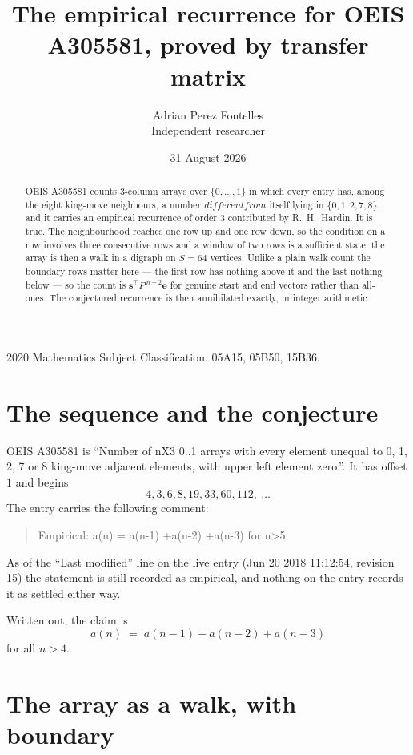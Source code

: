 \documentclass[11pt,a4paper]{article}
\title{The empirical recurrence for OEIS A305581, proved by transfer matrix}
\author{Adrian Perez Fontelles\\ \small Independent researcher}
\date{31 August 2026}
\theoremstyle{plain}
\theoremstyle{definition}
\begin{document}
\maketitle

\begin{abstract}
OEIS A305581 counts $3$-column arrays over $\{0,\dots,1\}$ in which every entry has,
among the eight king-move neighbours, a number $different from$ itself lying in $\{0,1,2,7,8\}$, and it carries an empirical
recurrence of order $3$ contributed by R.~H.~Hardin. It is true. The neighbourhood
reaches one row up and one row down, so the condition on a row involves three consecutive
rows and a window of two rows is a sufficient state; the array is then a walk in a digraph
on $S=64$ vertices. Unlike a plain walk count the boundary rows matter here --- the first
row has nothing above it and the last nothing below --- so the count is
$\mathbf{s}^{\!\top}P^{\,n-2}\mathbf{e}$ for genuine start and end vectors rather than
all-ones. The conjectured recurrence is then annihilated exactly, in integer arithmetic.
\end{abstract}

\noindent\small 2020 Mathematics Subject Classification. 05A15, 05B50, 15B36.\normalsize

\section{The sequence and the conjecture}

OEIS A305581 is ``Number of nX3 0..1 arrays with every element unequal to 0, 1, 2, 7 or 8 king-move adjacent elements, with upper left element zero.''. It has offset
$1$ and begins
\[
4, 3, 6, 8, 19, 33, 60, 112,\ \dots
\]
The entry carries the following comment:
\begin{quote}\small
Empirical: a(n) = a(n-1) +a(n-2) +a(n-3) for n>5
\end{quote}
As of the ``Last modified'' line on the live entry (Jun 20 2018 11:12:54, revision
15) the statement is still recorded as empirical, and nothing on the entry
records it as settled either way.

Written out, the claim is
\begin{equation}\label{eq:conj}
a(n)\;=\;a(n-1) + a(n-2) + a(n-3)
\end{equation}
for all $n>4$.

\section{The array as a walk, with boundary}
\end{document}
